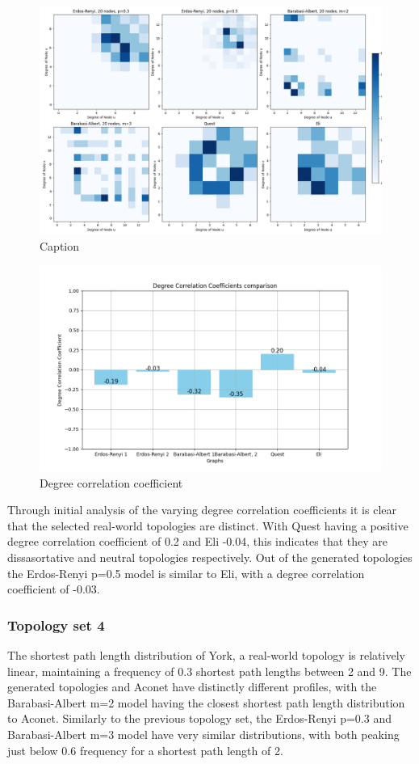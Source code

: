 \begin{figure}
    \centering
    \includegraphics[width=0.9\linewidth]{images/FINAL-TOPO-COMP/Degree-correlation-matrices/20-matrix.png}
    \caption{Caption}
    \label{fig:enter-label}
\end{figure}

\begin{figure}
    \centering
    \includegraphics[width=0.9\linewidth]{images/FINAL-TOPO-COMP/Degree-correlation-coeff/deg-coeff-20.png}
    \caption{Degree correlation coefficient}
    \label{fig:enter-label}
\end{figure}
Through initial analysis of the varying degree correlation coefficients it is clear that the selected real-world topologies are distinct. With Quest having a positive degree correlation coefficient of 0.2 and Eli -0.04, this indicates that they are dissasortative and neutral topologies respectively. Out of the generated topologies the Erdos-Renyi p=0.5 model is similar to Eli, with a degree correlation coefficient of -0.03. 

\subsubsection{Topology set 4}
The shortest path length distribution of York, a real-world topology is relatively linear, maintaining a frequency of 0.3 shortest path lengths between 2 and 9. The generated topologies and Aconet have distinctly different profiles, with the Barabasi-Albert m=2 model having the closest shortest path length distribution to Aconet. Similarly to the previous topology set, the Erdos-Renyi p=0.3 and Barabasi-Albert m=3 model have very similar distributions, with both peaking just below 0.6 frequency for a shortest path length of 2. 

